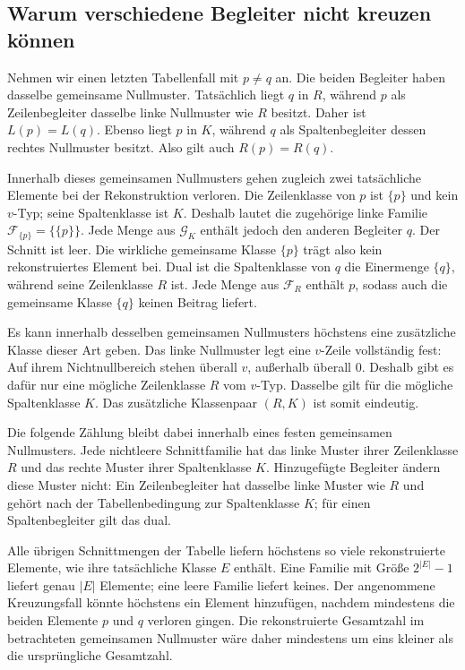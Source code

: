 \documentclass[a4paper,11pt]{article}
\theoremstyle{remark}
\begin{document}
\subsection{Warum verschiedene Begleiter nicht kreuzen können}

Nehmen wir einen letzten Tabellenfall mit $p\ne q$ an. Die beiden
Begleiter haben dasselbe gemeinsame Nullmuster. Tatsächlich liegt $q$ in
$R$, während $p$ als Zeilenbegleiter dasselbe linke Nullmuster wie $R$
besitzt. Daher ist $L(p)=L(q)$. Ebenso liegt $p$ in $K$, während $q$
als Spaltenbegleiter dessen rechtes Nullmuster besitzt. Also gilt auch
$R(p)=R(q)$.

Innerhalb dieses gemeinsamen Nullmusters gehen zugleich zwei tatsächliche
Elemente bei der Rekonstruktion verloren. Die Zeilenklasse von $p$ ist
$\{p\}$ und kein $v$-Typ; seine Spaltenklasse ist $K$. Deshalb lautet
die zugehörige linke Familie $\mathcal F_{\{p\}}=\{\{p\}\}$.
Jede Menge aus $\mathcal G_K$ enthält jedoch den anderen Begleiter $q$.
Der Schnitt ist leer. Die wirkliche gemeinsame Klasse $\{p\}$ trägt
also kein rekonstruiertes Element bei. Dual ist die Spaltenklasse von
$q$ die Einermenge $\{q\}$, während seine Zeilenklasse $R$ ist. Jede
Menge aus $\mathcal F_R$ enthält $p$, sodass auch die gemeinsame Klasse
$\{q\}$ keinen Beitrag liefert.

Es kann innerhalb desselben gemeinsamen Nullmusters höchstens eine
zusätzliche Klasse dieser Art geben. Das linke Nullmuster legt eine
$v$-Zeile vollständig fest: Auf ihrem Nichtnullbereich stehen überall
$v$, außerhalb überall $0$. Deshalb gibt es dafür nur eine mögliche
Zeilenklasse $R$ vom $v$-Typ. Dasselbe gilt für die mögliche
Spaltenklasse $K$. Das zusätzliche Klassenpaar $(R,K)$ ist somit
eindeutig.

Die folgende Zählung bleibt dabei innerhalb eines festen gemeinsamen
Nullmusters. Jede nichtleere Schnittfamilie hat das linke Muster ihrer
Zeilenklasse $R$ und das rechte Muster ihrer Spaltenklasse $K$.
Hinzugefügte Begleiter ändern diese Muster nicht: Ein Zeilenbegleiter
hat dasselbe linke Muster wie $R$ und gehört nach der Tabellenbedingung
zur Spaltenklasse $K$; für einen Spaltenbegleiter gilt das dual.

Alle übrigen Schnittmengen der Tabelle liefern höchstens so viele
rekonstruierte Elemente, wie ihre tatsächliche Klasse $E$ enthält.
Eine Familie mit Größe $2^{|E|}-1$ liefert genau $|E|$ Elemente; eine
leere Familie liefert keines. Der angenommene Kreuzungsfall könnte
höchstens ein Element hinzufügen, nachdem mindestens die beiden
Elemente $p$ und $q$ verloren gingen. Die rekonstruierte Gesamtzahl im
betrachteten gemeinsamen Nullmuster wäre daher mindestens um eins
kleiner als die ursprüngliche Gesamtzahl.
\end{document}
